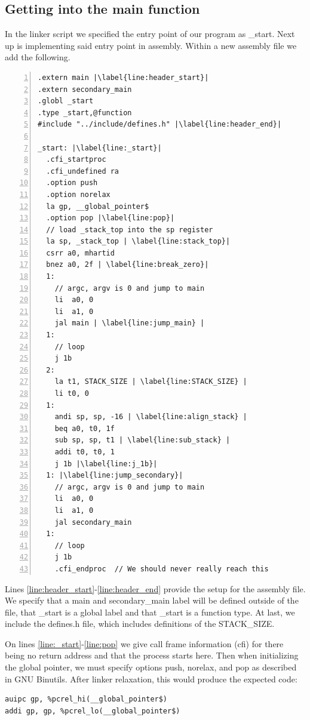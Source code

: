 \subsection{Getting into the main function}\label{sec:get_main}
In the linker script we specified the entry point of our program as \_start.
Next up is implementing said entry point in assembly. Within a new assembly file
we add the following.
\begin{lstlisting}[numbers=left, escapechar=|, caption=Assembly code for getting
to main function.]
.extern main |\label{line:header_start}|
.extern secondary_main
.globl _start
.type _start,@function
#include "../include/defines.h" |\label{line:header_end}|

_start: |\label{line:_start}|
  .cfi_startproc
  .cfi_undefined ra
  .option push
  .option norelax
  la gp, __global_pointer$
  .option pop |\label{line:pop}|
  // load _stack_top into the sp register
  la sp, _stack_top | \label{line:stack_top}|
  csrr a0, mhartid
  bnez a0, 2f | \label{line:break_zero}|
  1:
    // argc, argv is 0 and jump to main
    li  a0, 0
    li  a1, 0
    jal main | \label{line:jump_main} |
  1:
    // loop
    j 1b
  2:
    la t1, STACK_SIZE | \label{line:STACK_SIZE} |
    li t0, 0
  1:
    andi sp, sp, -16 | \label{line:align_stack} |
    beq a0, t0, 1f
    sub sp, sp, t1 | \label{line:sub_stack} |
    addi t0, t0, 1
    j 1b |\label{line:j_1b}|
  1: |\label{line:jump_secondary}|
    // argc, argv is 0 and jump to main
    li  a0, 0
    li  a1, 0
    jal secondary_main
  1:
    // loop
    j 1b
    .cfi_endproc  // We should never really reach this
\end{lstlisting}
Lines \ref{line:header_start}-\ref{line:header_end} provide the setup for the
assembly file. We specify that a main and secondary\_main label will be defined
outside of the file, that \_start is a global label and that \_start is a
function type. At last, we include the defines.h file, which includes
definitions of the STACK\_SIZE.

On lines \ref{line:_start}-\ref{line:pop} we give call frame information (cfi)
for there being no return address and that the process starts here. Then when
initializing the global pointer, we must specify options push, norelax, and pop
as described in GNU Binutils. \cite{GNU_bin} After linker relaxation, this would
produce the expected code:
\begin{lstlisting}
auipc gp, %pcrel_hi(__global_pointer$)
addi gp, gp, %pcrel_lo(__global_pointer$)
\end{lstlisting}

